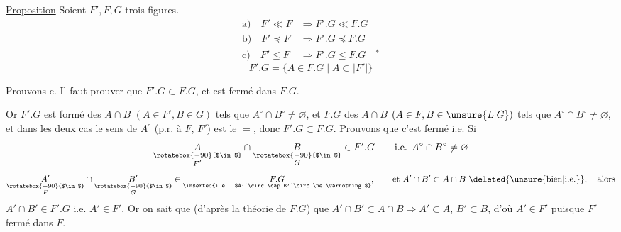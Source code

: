 
\uline{Proposition} Soient $F',F,G$ trois figures.
\[
\begin{aligned}
 \text{a)}\quad F'\ll F&\Longrightarrow F'.G\ll F.G\\
 \text{b)}\quad F'\preceq F&\Longrightarrow F'.G\preceq F.G\\
 \text{c)}\quad F'\leq F&\Longrightarrow F'.G\leq F.G\quad{}^{*}
\end{aligned}
\]
\[
 F'.G=\{A\in F.G\mid A\subset |F'|\}
\]

Prouvons c. Il faut prouver que  $F'.G\subset F.G$, et est fermé dans $F.G$.

 Or $F'.G$ est formé des $A\cap B$ $(A\in F',B\in G)$ tels que $A^\circ\cap B^\circ\ne\varnothing$, et $F.G$ des $A\cap B$ $(A\in F,B\in \unsure{L|G})$ tels que $A^\circ\cap B^\circ\ne\varnothing$, et dans les deux cas le sens de $A^\circ$ (p.r. à $F$,  $F'$) est le $=$, donc $F'.G\subset F.G$. Prouvons que c'est fermé i.e.
Si 
\[
 \underset{\substack{\rotatebox{-90}{$\in$}\\ F'}}{A}\cap
 \underset{\substack{\rotatebox{-90}{$\in$}\\ G}}{B}\in F'.G\qquad
 \text{i.e. } A^\circ\cap B^\circ\ne\varnothing
\]
\[
 \underset{\substack{\rotatebox{-90}{$\in$}\\ F}}{A'}\cap
 \underset{\substack{\rotatebox{-90}{$\in$}\\ G}}{B'}\in\underset{\text{\inserted{i.e. $A'^\circ\cap B'^\circ\ne\varnothing$}}}{F.G},\qquad
 \text{et } A'\cap B'\subset A\cap B\ \deleted{\unsure{\text{bien}|\text{i.e.}}},\quad\text{alors}
\]
$A'\cap B'\in F'.G$ i.e. $A'\in F'$. Or on sait que (d'après la théorie de $F.G$) que $A'\cap B'\subset A\cap B\Longrightarrow A'\subset A$, $B'\subset B$, d'où $A'\in F'$ puisque $F'$ fermé dans $F$.


